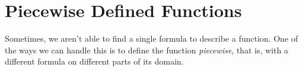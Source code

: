 \section{Piecewise Defined Functions}
Sometimes, we aren't able to find a single formula to describe a function. One of the ways we can handle this is to define the function \emph{piecewise}, that is, with a different formula on different parts of its domain.
 







%
